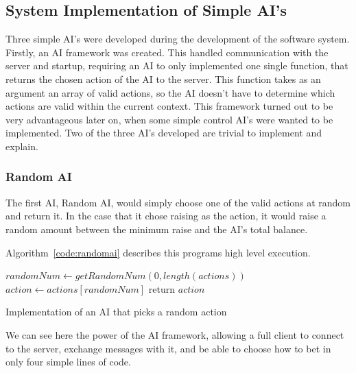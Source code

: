 \newpage{}

\subsection{System Implementation of Simple AI's}
Three simple AI's were developed during the development of the software system.
Firstly, an AI framework was created. This handled communication with the
server and startup, requiring an AI to only implemented one single function,
that returns the chosen action of the AI to the server. This function takes
as an argument an array of valid actions, so the AI doesn't have to determine
which actions are valid within the current context. This framework turned out
to be very advantageous later on, when some simple control AI's were wanted
to be implemented. Two of the three AI's developed are trivial to implement
and explain.

\subsubsection{Random AI}

The first AI, Random AI, would simply choose one of the valid actions at
random and return it. In the case that it chose raising as the action, it
would raise a random amount between the minimum raise and the AI's total
balance.

Algorithm~\ref{code:randomai} describes this programs high level execution.

\vspace{0.3cm}

\begin{algorithm}[H]
    \BlankLine{}
     $randomNum \leftarrow getRandomNum(0, length(actions))$\;
     $action \leftarrow actions[randomNum]$\;
     
     return $action$\;
\caption{Implementation of an AI that picks a random action}%
\label{code:randomai}
\end{algorithm}

\vspace{0.3cm}

We can see here the power of the AI framework, allowing a full client to connect
to the server, exchange messages with it, and be able to choose how to bet
in only four simple lines of code.


